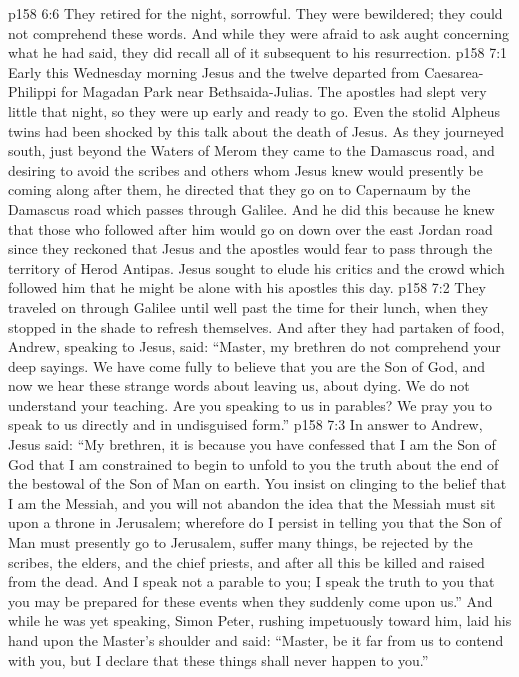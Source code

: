 \vs p158 6:6 They retired for the night, sorrowful. They were bewildered; they could not comprehend these words. And while they were afraid to ask aught concerning what he had said, they did recall all of it subsequent to his resurrection.
\vs p158 7:1 Early this Wednesday morning Jesus and the twelve departed from Caesarea\hyp{}Philippi for Magadan Park near Bethsaida\hyp{}Julias. The apostles had slept very little that night, so they were up early and ready to go. Even the stolid Alpheus twins had been shocked by this talk about the death of Jesus. As they journeyed south, just beyond the Waters of Merom they came to the Damascus road, and desiring to avoid the scribes and others whom Jesus knew would presently be coming along after them, he directed that they go on to Capernaum by the Damascus road which passes through Galilee. And he did this because he knew that those who followed after him would go on down over the east Jordan road since they reckoned that Jesus and the apostles would fear to pass through the territory of Herod Antipas. Jesus sought to elude his critics and the crowd which followed him that he might be alone with his apostles this day.
\vs p158 7:2 They traveled on through Galilee until well past the time for their lunch, when they stopped in the shade to refresh themselves. And after they had partaken of food, Andrew, speaking to Jesus, said: “Master, my brethren do not comprehend your deep sayings. We have come fully to believe that you are the Son of God, and now we hear these strange words about leaving us, about dying. We do not understand your teaching. Are you speaking to us in parables? We pray you to speak to us directly and in undisguised form.”
\vs p158 7:3 In answer to Andrew, Jesus said: \textcolor{ubdarkred}{“My brethren, it is because you have confessed that I am the Son of God that I am constrained to begin to unfold to you the truth about the end of the bestowal of the Son of Man on earth. You insist on clinging to the belief that I am the Messiah, and you will not abandon the idea that the Messiah must sit upon a throne in Jerusalem; wherefore do I persist in telling you that the Son of Man must presently go to Jerusalem, suffer many things, be rejected by the scribes, the elders, and the chief priests, and after all this be killed and raised from the dead. And I speak not a parable to you; I speak the truth to you that you may be prepared for these events when they suddenly come upon us.”} And while he was yet speaking, Simon Peter, rushing impetuously toward him, laid his hand upon the Master’s shoulder and said: “Master, be it far from us to contend with you, but I declare that these things shall never happen to you.”
